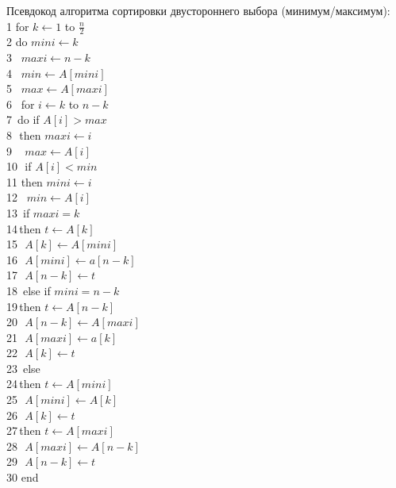 \documentclass[a4paper,12pt]{article}
\begin{document}
Псевдокод алгоритма сортировки двустороннего выбора (минимум/максимум):\\
1 for $k \leftarrow 1$ to $\frac{n}{2}$\\
2 \quad do $mini \leftarrow k$\\
3 \quad\, $maxi \leftarrow n - k$\\
4 \quad\, $min \leftarrow A[mini]$\\
5 \quad\, $max \leftarrow A[maxi]$\\
6 \quad\, for $i \leftarrow k$ to $n - k$\\
7 \quad\,\quad do if $A[i] > max$\\
8 \quad\,\quad\,\quad then $maxi \leftarrow i$\\
9 \quad\,\quad\,\quad\, $max \leftarrow A[i]$\\
10\quad\,\quad\, if $A[i] < min$\\
11\quad\,\quad\,\quad then $mini \leftarrow i$\\
12\quad\,\quad\,\quad\, $min \leftarrow A[i]$\\
13\quad\, if $maxi = k$\\
14\quad\,\quad then $t \leftarrow A[k]$\\
15\quad\,\quad\, $A[k] \leftarrow A[mini]$\\
16\quad\,\quad\, $A[mini] \leftarrow a[n - k]$\\
17\quad\,\quad\, $A[n - k] \leftarrow t$\\
18\quad\, else if $mini = n - k$\\
19\quad\,\quad then $t \leftarrow A[n - k]$\\
20\quad\,\quad\, $A[n - k] \leftarrow A[maxi]$\\
21\quad\,\quad\, $A[maxi] \leftarrow a[k]$\\
22\quad\,\quad\, $A[k] \leftarrow t$\\
23\quad\, else\\
24\quad\,\quad then $t \leftarrow A[mini]$\\
25\quad\,\quad\, $A[mini] \leftarrow A[k]$\\
26\quad\,\quad\, $A[k] \leftarrow t$\\
27\quad\,\quad then $t \leftarrow A[maxi]$\\
28\quad\,\quad\, $A[maxi] \leftarrow A[n - k]$\\
29\quad\,\quad\, $A[n - k] \leftarrow t$\\
30 end\\

\newpage
\end{document}
